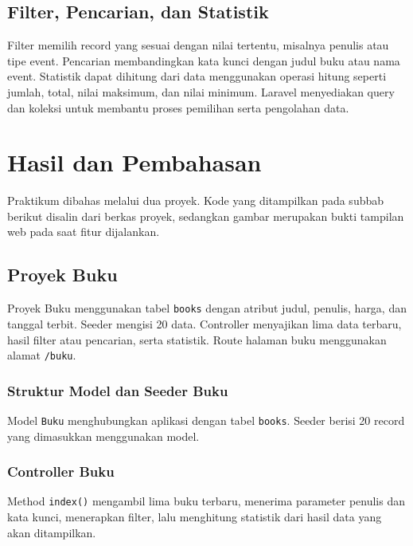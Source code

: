 \documentclass[a4paper,oneside,11pt]{book}
\begin{document}
\section{Filter, Pencarian, dan Statistik}
Filter memilih record yang sesuai dengan nilai tertentu, misalnya penulis atau tipe event. Pencarian membandingkan kata kunci dengan judul buku atau nama event. Statistik dapat dihitung dari data menggunakan operasi hitung seperti jumlah, total, nilai maksimum, dan nilai minimum. Laravel menyediakan query dan koleksi untuk membantu proses pemilihan serta pengolahan data.\cite{laravel-query}

\chapter{Hasil dan Pembahasan}
Praktikum dibahas melalui dua proyek. Kode yang ditampilkan pada subbab berikut disalin dari berkas proyek, sedangkan gambar merupakan bukti tampilan web pada saat fitur dijalankan.

\section{Proyek Buku}
Proyek Buku menggunakan tabel \texttt{books} dengan atribut judul, penulis, harga, dan tanggal terbit. Seeder mengisi 20 data. Controller menyajikan lima data terbaru, hasil filter atau pencarian, serta statistik. Route halaman buku menggunakan alamat \texttt{/buku}.

\subsection{Struktur Model dan Seeder Buku}
Model \texttt{Buku} menghubungkan aplikasi dengan tabel \texttt{books}. Seeder berisi 20 record yang dimasukkan menggunakan model.



\subsection{Controller Buku}
Method \texttt{index()} mengambil lima buku terbaru, menerima parameter penulis dan kata kunci, menerapkan filter, lalu menghitung statistik dari hasil data yang akan ditampilkan.

\end{document}
